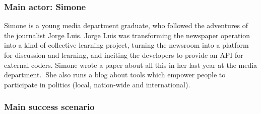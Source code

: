 \subsubsection{Main actor: Simone}

Simone is a young media department graduate, who followed the adventures
of the journalist Jorge Luis. Jorge Luis was transforming the newspaper
operation into a kind of collective learning project, turning the
newsroom into a platform for discussion and learning, and inciting the
developers to provide an API for external coders. Simone wrote a paper
about all this in her last year at the media department.\textbf{~}She
also runs a blog about tools which empower people to participate in
politics (local, nation-wide and international).

\subsubsection{Main success scenario}

